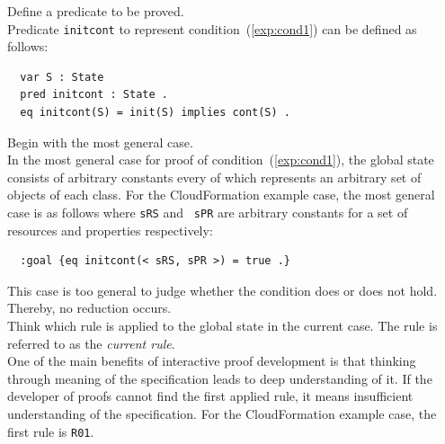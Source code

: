 \documentclass[12pt]{report}
\begin{document}
 Define a predicate to be proved. \\
Predicate {\tt initcont} to represent condition~(\ref{exp:cond1}) can be defined as follows:
\small
\begin{verbatim}
  var S : State
  pred initcont : State .
  eq initcont(S) = init(S) implies cont(S) .
\end{verbatim}
\normalsize

 Begin with the most general case. \\ In the
most general case for proof of condition~(\ref{exp:cond1}), the global
state consists of arbitrary constants every of which represents an
arbitrary set of objects of each class. For the CloudFormation example
case, the most general case is as follows where {\tt sRS} and {\tt
  sPR} are arbitrary constants for a set of resources and properties
respectively:
\small
\begin{verbatim}
  :goal {eq initcont(< sRS, sPR >) = true .}
\end{verbatim}
\normalsize
This case is too general to judge whether the condition does or does
not hold. Thereby, no reduction occurs.\\

 Think which rule is applied to the global
state in the current case. The rule is referred to as the {\it current
rule}.\\
One of the main benefits of interactive proof development is that
thinking through meaning of the specification leads to deep
understanding of it. If the developer of proofs cannot find the first
applied rule, it means insufficient understanding of the
specification. For the CloudFormation example case, the first rule is
{\tt R01}. \\
\end{document}
